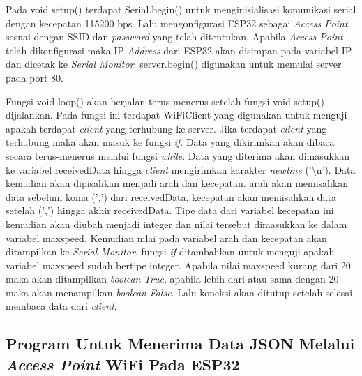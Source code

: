 Pada void setup() terdapat Serial.begin() untuk menginisialisasi komunikasi serial dengan kecepatan 115200 bps. Lalu mengonfigurasi ESP32 sebagai \emph{Access Point} sesuai dengan SSID dan \emph{password} yang telah ditentukan. Apabila \emph{Access Point} telah dikonfigurasi maka IP \emph{Address} dari ESP32 akan disimpan pada variabel IP dan dicetak ke \emph{Serial Monitor}. server.begin() digunakan untuk memulai server pada port 80.

Fungsi void loop() akan berjalan terus-menerus setelah fungsi void setup() dijalankan. Pada fungsi ini terdapat WiFiClient yang digunakan untuk menguji apakah terdapat \emph{client} yang terhubung ke server. Jika terdapat \emph{client} yang terhubung maka akan masuk ke fungsi \emph{if}. Data yang dikirimkan akan dibaca secara terus-menerus melalui fungsi \emph{while}. Data yang diterima akan dimasukkan ke variabel receivedData hingga \emph{client} mengirimkan karakter \emph{newline} ('\textbackslash n'). Data kemudian akan dipisahkan menjadi arah dan kecepatan. arah akan memisahkan data sebelum koma (',') dari receivedData. kecepatan akan memisahkan data setelah (',') hingga akhir receivedData. Tipe data dari variabel kecepatan ini kemudian akan diubah menjadi integer dan nilai tersebut dimasukkan ke dalam variabel maxspeed. Kemudian nilai pada variabel arah dan kecepatan akan ditampilkan ke \emph{Serial Monitor}. fungsi \emph{if} ditambahkan untuk menguji apakah variabel maxspeed sudah bertipe integer. Apabila nilai maxspeed kurang dari 20 maka akan ditampilkan \emph{boolean} \emph{True}, apabila lebih dari atau sama dengan 20 maka akan menampilkan \emph{boolean} \emph{False}. Lalu koneksi akan ditutup setelah selesai membaca data dari \emph{client}.

\subsection{Program Untuk Menerima Data JSON Melalui \emph{Access Point} WiFi Pada ESP32}

